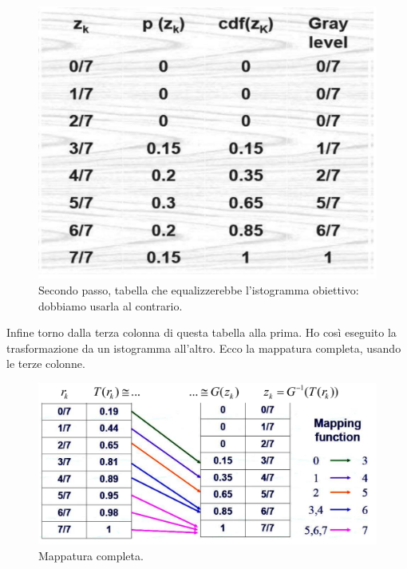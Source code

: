 \documentclass[a4paper,11pt]{article}
\begin{document}
\renewcommand{\thefigure}{5.21}
\begin{figure}[!h]
  \centering
    \includegraphics[scale=0.4]{images/5/hist_spec_3.png}
    \caption{Secondo passo, tabella che equalizzerebbe l'istogramma obiettivo: dobbiamo usarla al contrario.}
\end{figure}

Infine torno dalla terza colonna di questa tabella alla prima. Ho così eseguito la trasformazione da un istogramma all'altro. Ecco la mappatura completa, usando le terze colonne.

\renewcommand{\thefigure}{5.22}
\begin{figure}[!h]
  \centering
    \includegraphics[scale=0.4]{images/5/hist_spec_4.png}
    \caption{Mappatura completa.}
\end{figure}
\end{document}
